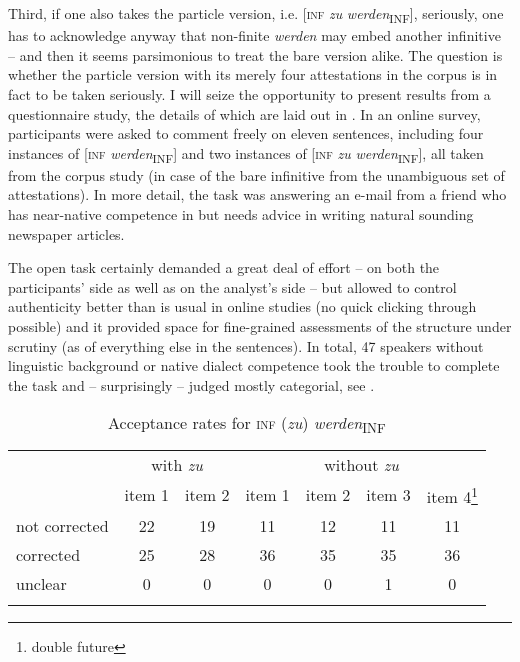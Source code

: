 \documentclass[output=paper,hidelinks]{langscibook}
\begin{document}
Third, if one also takes the particle version, i.e. [\textsc{inf} \emph{zu} \textit{werden}\textsubscript{INF}], seriously, one has to acknowledge anyway that non-finite \emph{werden} may embed another infinitive – and then it seems parsimonious to treat the bare version alike. The question is whether the particle version with its merely four attestations in the corpus is in fact to be taken seriously. I will seize the opportunity to present results from a questionnaire study, the details of which are laid out in \citet{Reiner2018}.
In an online survey, participants were asked to comment freely on eleven sentences, including four instances of [\textsc{inf} \textit{werden}\textsubscript{INF}] and two instances of [\textsc{inf} \emph{zu} \textit{werden}\textsubscript{INF}], all taken from the corpus study (in case of the bare infinitive from the unambiguous set of attestations). In more detail, the task was answering an e-mail from a friend who has near-native competence in  but needs advice in writing natural sounding newspaper articles.

The open task certainly demanded a great deal of effort – on both the participants’ side as well as on the analyst’s side – but allowed to control authenticity better than is usual in online studies (no quick clicking through possible) and it provided space for fine-grained assessments of the structure under scrutiny (as of everything else in the sentences). In total, 47 speakers without linguistic background or native dialect competence took the trouble to complete the task and – surprisingly – judged mostly categorial, see .

\begin{table}
\caption{Acceptance rates for \textsc{inf} ({\emph{zu}}) \textit{werden}\textsubscript{INF}\label{tab:reiner:1}}
\begin{tabular}{lcccccc}
\lsptoprule
&  \multicolumn{2}{c}{with \emph{zu}}   & \multicolumn{4}{c}{without \emph{zu}}\\\cmidrule(lr){2-3}\cmidrule(lr){4-7}
&  item 1 &  item 2 &  item 1 &  item 2 &  item 3 &  item 4\footnote{double future}\\\midrule
not corrected     & 22 & 19 & 11 & 12 & 11 & 11 \\
corrected   & 25 & 28 & 36 & 35 & 35 & 36 \\
unclear & 0 & 0 & 0 & 0 & 1 & 0 \\\lspbottomrule
\end{tabular}
\end{table}
\end{document}
